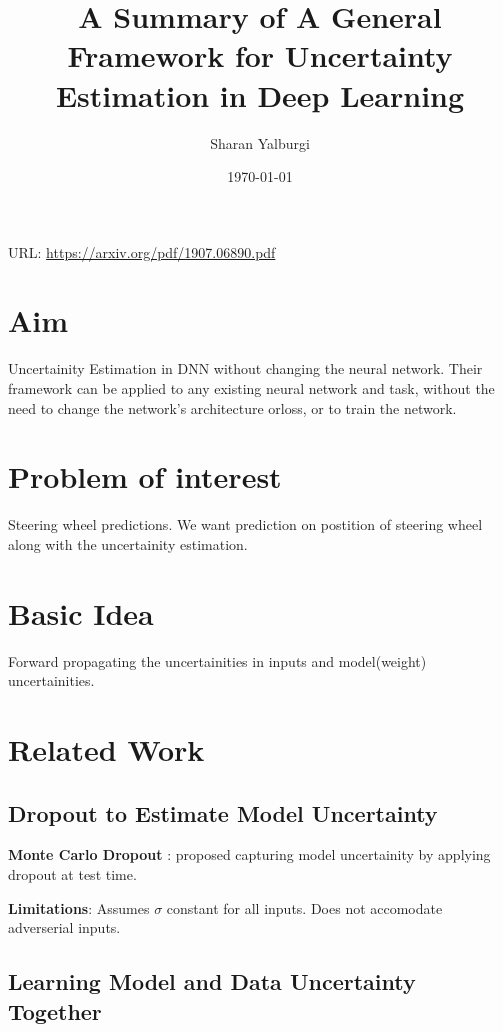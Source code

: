 \documentclass[a4paper]{article}
\author{Sharan Yalburgi}
\date{\today}
\title{A Summary of A General Framework for Uncertainty Estimation in Deep Learning}
\begin{document}
\maketitle
URL: \url{https://arxiv.org/pdf/1907.06890.pdf}

\section{Aim}
\label{sec-1}

Uncertainity Estimation in DNN without changing the neural network.  Their framework  can  be  applied  to  any  existing  neural  network  and task,  without  the  need  to  change  the  network’s  architecture  orloss,  or  to  train  the  network. 


\section{Problem of interest}
\label{sec-2}

Steering wheel predictions. We want prediction on postition of steering wheel along with the uncertainity estimation.

\section{Basic Idea}
\label{sec-3}

Forward propagating the uncertainities in inputs and model(weight) uncertainities.

\section{Related Work}
\label{sec-4}

\subsection{Dropout to Estimate Model Uncertainty}
\label{sec-4-1}

\textbf{Monte Carlo Dropout} : \cite{gal2016dropout} proposed capturing model uncertainity by applying dropout at test time.

\textbf{Limitations}: Assumes $\sigma$ constant for all inputs. Does not accomodate adverserial inputs.

\subsection{Learning Model and Data Uncertainty Together}
\label{sec-4-2}
\end{document}
